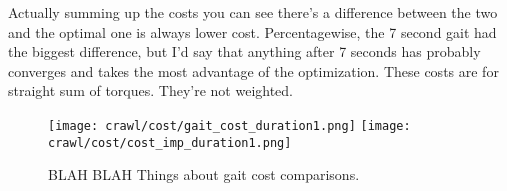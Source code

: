 Actually summing up the costs you can see there's a difference between the two and the optimal
one is always lower cost.
Percentagewise, the 7 second gait had the biggest difference, but I'd say that anything after
7 seconds has probably converges and takes the most advantage of the optimization.
These costs are for straight sum of torques. They're not weighted.

\begin{figure}
  \texttt{[image: crawl/cost/gait\_cost\_duration1.png]}
  \texttt{[image: crawl/cost/cost\_imp\_duration1.png]}
  \caption{BLAH BLAH Things about gait cost comparisons.}
  \label{fig:cost_duration1}
\end{figure}


